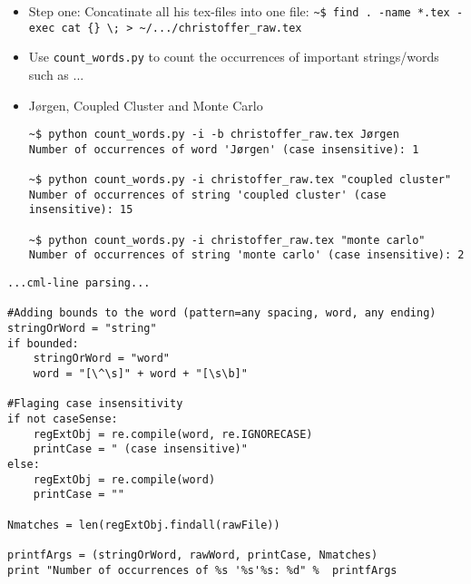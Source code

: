 \documentclass{beamer}
\begin{document}
\begin{frame}[containsverbatim]
\begin{itemize}
 \item Step one: Concatinate all his tex-files into one file:  
 \vspace{0.2cm}
\scriptsize
\verb+~$ find . -name *.tex -exec cat {} \; > ~/.../christoffer_raw.tex+
\normalsize

 \item Use \verb+count_words.py+ to count the occurrences of important strings/words such as ...

\end{itemize}
\end{frame}

\begin{frame}[containsverbatim]
\begin{itemize}

 \item Jørgen, Coupled Cluster and Monte Carlo
 \vspace{0.2cm}
\scriptsize
\begin{verbatim}
~$ python count_words.py -i -b christoffer_raw.tex Jørgen
Number of occurrences of word 'Jørgen' (case insensitive): 1

~$ python count_words.py -i christoffer_raw.tex "coupled cluster"
Number of occurrences of string 'coupled cluster' (case insensitive): 15

~$ python count_words.py -i christoffer_raw.tex "monte carlo"
Number of occurrences of string 'monte carlo' (case insensitive): 2

\end{verbatim}
\normalsize
\end{itemize}
\end{frame}


\begin{frame}[containsverbatim]
\tiny
\begin{verbatim}
...cml-line parsing...

#Adding bounds to the word (pattern=any spacing, word, any ending)
stringOrWord = "string"
if bounded:
    stringOrWord = "word"
    word = "[\^\s]" + word + "[\s\b]"
    
#Flaging case insensitivity
if not caseSense:
    regExtObj = re.compile(word, re.IGNORECASE)
    printCase = " (case insensitive)"
else:
    regExtObj = re.compile(word)
    printCase = ""

Nmatches = len(regExtObj.findall(rawFile))

printfArgs = (stringOrWord, rawWord, printCase, Nmatches)
print "Number of occurrences of %s '%s'%s: %d" %  printfArgs
\end{verbatim}
\normalsize
\end{frame}
\end{document}
